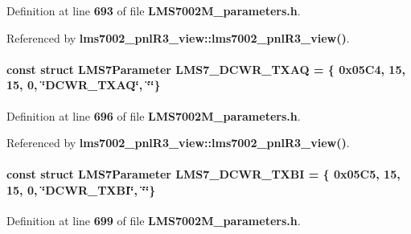 Definition at line {\bf 693} of file {\bf L\+M\+S7002\+M\+\_\+parameters.\+h}.



Referenced by {\bf lms7002\+\_\+pnl\+R3\+\_\+view\+::lms7002\+\_\+pnl\+R3\+\_\+view()}.

\paragraph[{L\+M\+S7\+\_\+\+D\+C\+W\+R\+\_\+\+T\+X\+AQ}]{\setlength{\rightskip}{0pt plus 5cm}const struct {\bf L\+M\+S7\+Parameter} L\+M\+S7\+\_\+\+D\+C\+W\+R\+\_\+\+T\+X\+AQ = \{ 0x05\+C4, 15, 15, 0, \char`\"{}\+D\+C\+W\+R\+\_\+\+T\+X\+A\+Q\char`\"{}, \char`\"{}\char`\"{}\}\hspace{0.3cm}{\ttfamily [static]}}\label{LMS7002M__parameters_8h_a49c4a32cde6790c8306f7cdae898d385}


Definition at line {\bf 696} of file {\bf L\+M\+S7002\+M\+\_\+parameters.\+h}.



Referenced by {\bf lms7002\+\_\+pnl\+R3\+\_\+view\+::lms7002\+\_\+pnl\+R3\+\_\+view()}.

\paragraph[{L\+M\+S7\+\_\+\+D\+C\+W\+R\+\_\+\+T\+X\+BI}]{\setlength{\rightskip}{0pt plus 5cm}const struct {\bf L\+M\+S7\+Parameter} L\+M\+S7\+\_\+\+D\+C\+W\+R\+\_\+\+T\+X\+BI = \{ 0x05\+C5, 15, 15, 0, \char`\"{}\+D\+C\+W\+R\+\_\+\+T\+X\+B\+I\char`\"{}, \char`\"{}\char`\"{}\}\hspace{0.3cm}{\ttfamily [static]}}\label{LMS7002M__parameters_8h_adb621614171896ef4281d16e185b5a00}


Definition at line {\bf 699} of file {\bf L\+M\+S7002\+M\+\_\+parameters.\+h}.



